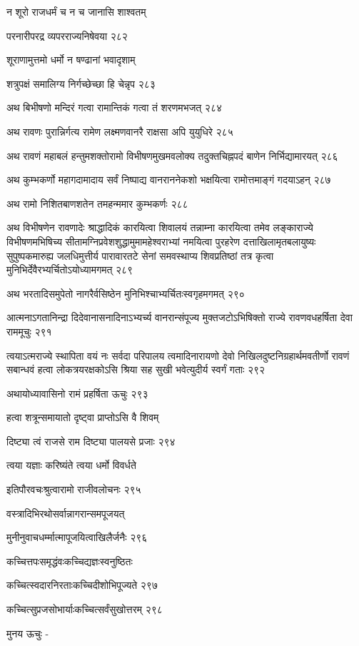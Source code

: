 न शूरो राजधर्मं च न च जानासि शाश्वतम्

परनारीपरद्र व्यपरराज्यनिषेवया २८२

शूराणामुत्तमो धर्मो न षण्ढानां भवादृशाम्

शत्रुपक्षं समालिग्य निर्गच्छेच्छा हि चेन्नृप २८३

अथ बिभीषणो मन्दिरं गत्वा रामान्तिकं गत्वा तं शरणमभजत् २८४

अथ रावणः पुरान्निर्गत्य रामेण लक्ष्मणवानरै राक्षसा अपि युयुधिरे २८५

अथ रावणं महाबलं हन्तुमशक्तोरामो विभीषणमुखमवलोक्य तदुक्तचिह्नपदं बाणेन निर्भिद्यामारयत्
 २८६

अथ कुम्भकर्णो महागदामादाय सर्वं निष्पाद्य वानराननेकशो भक्षयित्वा रामोत्तमाङ्गं
गदयाऽहन् २८७

अथ रामो निशितबाणशतेन तमहन्ममार कुम्भकर्णः २८८

अथ विभीषणेन रावणादेः श्राद्धादिकं कारयित्वा शिवालयं तन्नाम्ना कारयित्वा तमेव
लङ्काराज्ये विभीषणमभिषिच्य सीतामग्निप्रवेशशुद्धामुमामहेश्वराभ्यां नमयित्वा पुरहरेण
दत्ताखिलामृतबलायुष्यः सुपुष्पकमारुह्य जलधिमुत्तीर्य पारावारतटे सेनां समवस्थाप्य
शिवप्रतिष्ठां तत्र कृत्वा मुनिभिर्देवैरभ्यर्चितोऽयोध्यामगमत् २८९

अथ भरतादिसमुपेतो नागरैर्वसिष्ठेन मुनिभिश्चाभ्यर्चितःस्वगृहमगमत् २९०

आत्मनाऽगतानिन्द्रा दिदेवानासनादिनाऽभ्यर्च्य वानरान्संपूज्य मुक्तजटोऽभिषिक्तो राज्ये
रावणवधहर्षिता देवा राममूचुः २९१

त्वयाऽत्मराज्ये स्थापिता वयं नः सर्वदा परिपालय त्वमादिनारायणो देवो
निखिलदुष्टनिग्रहार्थमवतीर्णो रावणं सबान्धवं हत्वा लोकत्रयरक्षकोऽसि श्रिया सह सुखी
भवेत्युदीर्य स्वर्गं गताः २९२

अथायोध्यावासिनो रामं प्रहर्षिता ऊचुः २९३

हत्वा शत्रून्समायातो दृष्ट्वा प्राप्तोऽसि वै शिवम्

दिष्ट्या त्वं राजसे राम दिष्ट्या पालयसे प्रजाः २९४

त्वया यज्ञाः करिष्यंते त्वया धर्मो विवर्धते

इतिपौरवचःश्रुत्वारामो राजीवलोचनः २९५

वस्त्रादिभिरथोसर्वान्नागरान्समपूजयत्

मुनीनुवाचधर्म्मात्मापूजयित्वाखिलैर्जनैः २९६

कच्चित्तपःसमृद्धंवःकच्चिद्यज्ञःस्वनुष्ठितः

कच्चित्स्वदारनिरताःकच्चिदीशोभिपूज्यते २९७

कच्चित्सुप्रजसोभार्याःकच्चित्सर्वंसुखोत्तरम् २९८

मुनय ऊचुः -

